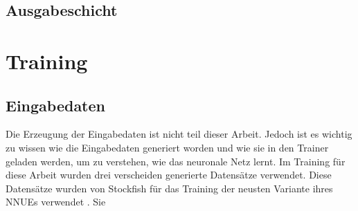 \subsection{Ausgabeschicht}


\section{Training}

\subsection{Eingabedaten}

Die Erzeugung der Eingabedaten ist nicht teil dieser Arbeit. Jedoch ist es wichtig zu wissen wie die Eingabedaten generiert worden und wie sie in den Trainer geladen werden, um zu verstehen, wie das neuronale Netz lernt. Im Training für diese Arbeit wurden drei verscheiden generierte Datensätze verwendet. Diese Datensätze wurden von Stockfish für das Training der neusten Variante ihres \acp{NNUE} verwendet \cite{StockfishNewestNetJul04}. Sie






